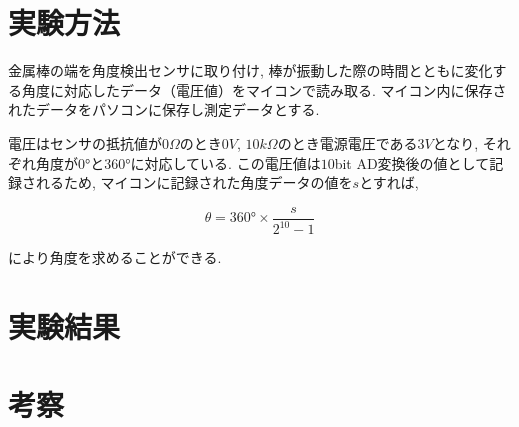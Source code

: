 \documentclass{jarticle}
\begin{document}









\section{実験方法}

金属棒の端を角度検出センサに取り付け, 棒が振動した際の時間とともに変化する角度に対応したデータ（電圧値）をマイコンで読み取る.
マイコン内に保存されたデータをパソコンに保存し測定データとする.

電圧はセンサの抵抗値が$0\Omega$のとき$0V$, $10k\Omega$のとき電源電圧である$3V$となり, それ
ぞれ角度が$0°$と$360°$に対応している. この電圧値は$10$bit AD変換後の値として記
録されるため, マイコンに記録された角度データの値を$s$とすれば,

\begin{equation}
  \theta=360°\times\frac{s}{2^{10}-1}
\end{equation}

により角度を求めることができる.



\section{実験結果}



\section{考察}
\end{document}

